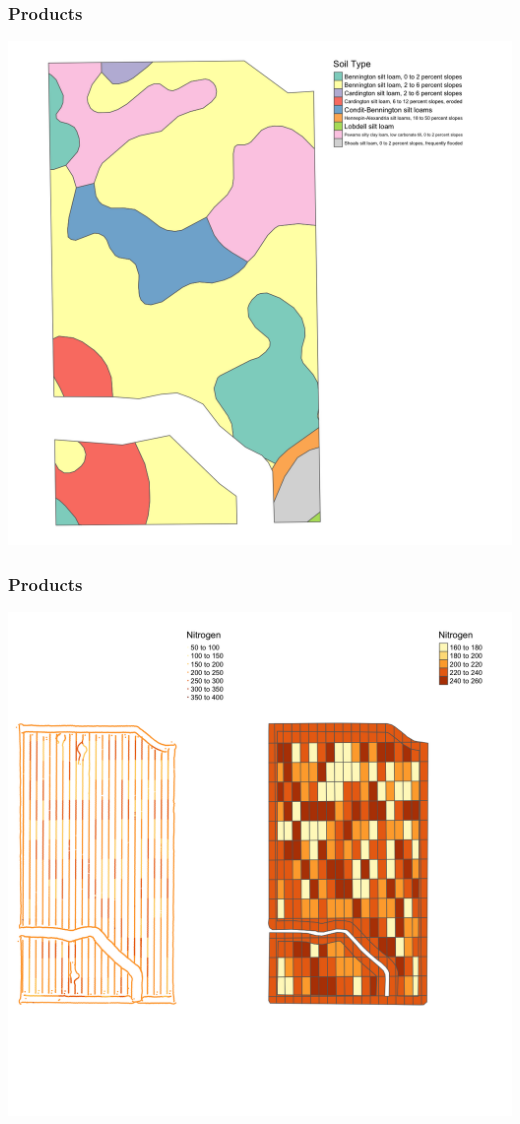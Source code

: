 \documentclass[11pt]{beamer}
\begin{document}
\begin{frame}[fragile]
\frametitle{Products}
  \includegraphics[height=0.75\textheight]{./img/rmd-map_soil_spatial-1}
\end{frame}

\begin{frame}[fragile]
\frametitle{Products}
  \includegraphics[height=0.75\textheight]{./img/rmd-nitrogenmap-2.png}
\end{frame}
\end{document}
